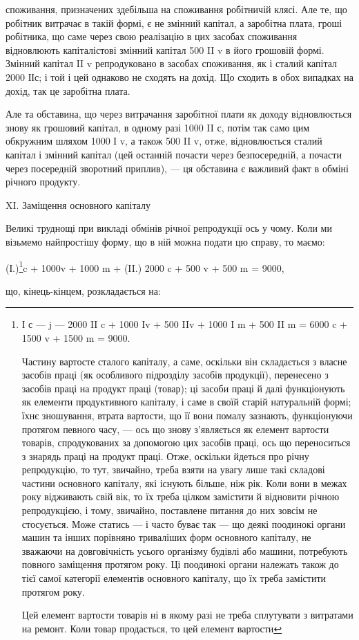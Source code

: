 \parcont{}  %
споживання, призначених здебільша на споживання робітничій клясі.
Але те, що робітник витрачає в такій формі, є не змінний капітал, а
заробітна плата, гроші робітника, що саме через свою реалізацію в цих
засобах споживання відновлюють капіталістові змінний капітал 500 II v
в його грошовій формі. Змінний капітал II v репродуковано в засобах
споживання, як і сталий капітал 2000 ІІс; і той і цей однаково не
сходять на дохід. Що сходить в обох випадках на дохід, так це заробітна
плата.

Але та обставина, що через витрачання заробітної плати як доходу
відновлюється знову як грошовий капітал, в одному разі 1000 II с,
потім так само цим обкружним шляхом 1000 І v, а також 500 II v,
отже, відновлюється сталий капітал і змінний капітал (цей останній
почасти через безпосередній, а почасти через посередній зворотний приплив),
— ця обставина є важливий факт в обміні річного продукту.

XI. Заміщення основного капіталу

Великі труднощі при викладі обмінів річної репродукції ось у чому.
Коли ми візьмемо найпростішу форму, що в ній можна подати цю
справу, то маємо:

(І.)\footnote{
І с — j — 2000 II c + 1000 Iv + 500 IIv + 1000 I m + 500 II m =
6000 c + 1500 v + 1500 m = 9000.

Частину вартосте сталого капіталу, а саме, оскільки він складається
з власне засобів праці (як особливого підрозділу засобів продукції),
перенесено з засобів праці на продукт праці (товар); ці засоби праці
й далі функціонують як елементи продуктивного капіталу, і саме в своїй
старій натуральній формі; їхнє зношування, втрата вартости, що її вони
помалу зазнають, функціонуючи протягом певного часу, — ось що знову
з’являється як елемент вартости товарів, спродукованих за допомогою цих
засобів праці, ось що переноситься з знарядь праці на продукт праці. Отже,
оскільки йдеться про річну репродукцію, то тут, звичайно, треба взяти
на увагу лише такі складові частини основного капіталу, які існують
більше, ніж рік. Коли вони в межах року відживають свій вік, то їх
треба цілком замістити й відновити річною репродукцією, і тому, звичайно,
поставлене питання до них зовсім не стосується. Може статись —
і часто буває так — що деякі поодинокі органи машин та інших порівняно
триваліших форм основного капіталу, не зважаючи на довговічність
усього організму будівлі або машини, потребують повного заміщення
протягом року. Ці поодинокі органи належать також до тієї самої категорії
елементів основного капіталу, що їх треба замістити протягом року.

Цей елемент вартости товарів ні в якому разі не треба сплутувати з
витратами на ремонт. Коли товар продасться, то цей елемент вартости
}c + 1000v + 1000 m +
(II.) 2000 c + 500 v + 500 m = 9000,

що, кінець-кінцем, розкладається на:
\parbreak{}  %
